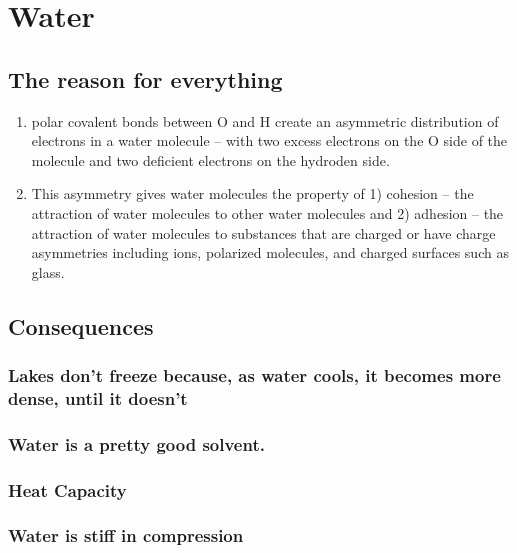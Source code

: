 \documentclass[]{book}
\providecommand{\tightlist}{%
  \setlength{\itemsep}{0pt}\setlength{\parskip}{0pt}}
\begin{document}
\chapter{Water}\label{water}

\section{The reason for everything}\label{the-reason-for-everything}

\begin{enumerate}
\def\labelenumi{\arabic{enumi}.}
\tightlist
\item
  polar covalent bonds between O and H create an asymmetric distribution
  of electrons in a water molecule -- with two excess electrons on the O
  side of the molecule and two deficient electrons on the hydroden side.
\item
  This asymmetry gives water molecules the property of 1) cohesion --
  the attraction of water molecules to other water molecules and 2)
  adhesion -- the attraction of water molecules to substances that are
  charged or have charge asymmetries including ions, polarized
  molecules, and charged surfaces such as glass.
\end{enumerate}

\section{Consequences}\label{consequences}

\subsection{Lakes don't freeze because, as water cools, it becomes more
dense, until it
doesn't}\label{lakes-dont-freeze-because-as-water-cools-it-becomes-more-dense-until-it-doesnt}

\subsection{Water is a pretty good
solvent.}\label{water-is-a-pretty-good-solvent.}

\subsection{Heat Capacity}\label{heat-capacity}

\subsection{Water is stiff in
compression}\label{water-is-stiff-in-compression}
\end{document}

